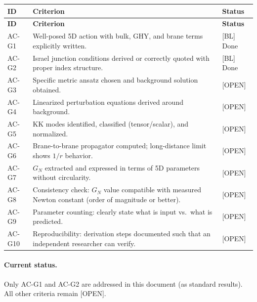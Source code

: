 \documentclass[11pt,a4paper]{article}
\newcommand{\tagBL}{\textcolor{blue!70!black}{[BL]}}
\newcommand{\tagOPEN}{\textcolor{red!70!black}{[OPEN]}}
\begin{document}
\begin{center}
\renewcommand{\arraystretch}{1.3}
\begin{longtable}{p{1.5cm}p{9cm}p{2cm}}
\toprule
\textbf{ID} & \textbf{Criterion} & \textbf{Status} \\
\midrule
\endfirsthead
\toprule
\textbf{ID} & \textbf{Criterion} & \textbf{Status} \\
\midrule
\endhead
\bottomrule
\endfoot

AC-G1 & Well-posed 5D action with bulk, GHY, and brane terms explicitly written. & \tagBL{} Done \\

AC-G2 & Israel junction conditions derived or correctly quoted with proper index structure. & \tagBL{} Done \\

AC-G3 & Specific metric ansatz chosen and background solution obtained. & \tagOPEN{} \\

AC-G4 & Linearized perturbation equations derived around background. & \tagOPEN{} \\

AC-G5 & KK modes identified, classified (tensor/scalar), and normalized. & \tagOPEN{} \\

AC-G6 & Brane-to-brane propagator computed; long-distance limit shows $1/r$ behavior. & \tagOPEN{} \\

AC-G7 & $G_N$ extracted and expressed in terms of 5D parameters without circularity. & \tagOPEN{} \\

AC-G8 & Consistency check: $G_N$ value compatible with measured Newton constant (order of magnitude or better). & \tagOPEN{} \\

AC-G9 & Parameter counting: clearly state what is input vs.\ what is predicted. & \tagOPEN{} \\

AC-G10 & Reproducibility: derivation steps documented such that an independent researcher can verify. & \tagOPEN{} \\

\end{longtable}
\end{center}

\paragraph{Current status.}
Only AC-G1 and AC-G2 are addressed in this document (as standard results).
All other criteria remain \tagOPEN{}.
\end{document}
